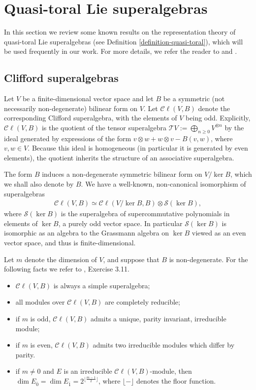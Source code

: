 \documentclass[12pt, a4paper, reqno]{amsart}
\def\TT{\mathcal{T}}
\def\CC{\mathcal{C}}
\def\ol{\overline}
\theoremstyle{definition}
\theoremstyle{definition}
\theoremstyle{definition}
\numberwithin{theorem}{section}
\numberwithin{lemma}{section}
\numberwithin{remark}{section}
\numberwithin{definition}{section}
\numberwithin{corollary}{section}
\numberwithin{proposition}{section}
\numberwithin{example}{section}
\begin{document}
	\section{Quasi-toral Lie superalgebras}\label{section_quasi_toral}
	
	In this section we review some known results on the representation theory of quasi-toral Lie superalgebras (see Definition \ref{definition-quasi-toral}), which will be used frequently in our work. For more details, we refer the reader to \cite{G} and \cite{GSS}.
	
	\subsection{Clifford superalgebras}\label{section_cliff_algs}
	Let \(V\) be a finite-dimensional vector space and let \(B\) be a symmetric (not necessarily non-degenerate) bilinear form on \(V\). Let \(\mathcal{C}\ell(V,B)\) denote the corresponding Clifford superalgebra, with the elements of \(V\) being odd.  Explicitly, $\CC\ell(V,B)$ is the quotient of the tensor superalgebra $\TT V:=\bigoplus\limits_{n\geq0}V^{\otimes n}$ by the ideal generated by expressions of the form $v\otimes w+w\otimes v-B(v,w)$, where $v,w\in V$.  Because this ideal is homogeneous (in particular it is generated by even elements), the quotient inherits the structure of an associative superalgebra.
	
	The form \(B\) induces a non-degenerate symmetric bilinear form on \(V/\ker B\), which we shall also denote by \(B\). We have a well-known, non-canonical isomorphism of superalgebras
	\begin{align}\label{eq_iso_cliff}
		\mathcal{C}\ell(V,B) \simeq \mathcal{C}\ell(V/\ker B,B) \otimes \mathcal{S} (\ker B),
	\end{align}
	where \(\mathcal{S}(\ker B)\) is the superalgebra of supercommutative polynomials in elements of \(\ker B\), a purely odd vector space. In particular $\mathcal{S}(\ker B)$ is isomorphic as an algebra to the Grassmann algebra on $\ker B$ viewed as an even vector space, and thus is finite-dimensional.
	
	Let $m$ denote the dimension of \(V\), and suppose that \(B\) is non-degenerate.  For the following facts we refer to \cite{CW}, Exercise 3.11.
	
	\begin{itemize}
		\item \(\mathcal{C}\ell(V,B)\) is always a simple superalgebra;
		\item all modules over \(\mathcal{C}\ell(V,B)\) are completely reducible;
		\item if \(m\) is odd, \(\mathcal{C}\ell(V,B)\) admits a unique, parity invariant, irreducible module;
		\item if \(m\) is even, \(\mathcal{C}\ell(V,B)\) admits two irreducible modules which differ by parity. 
		\item if \(m \neq 0\) and \(E\) is an irreducible \(\mathcal{C}\ell(V,B)\)-module, then \(\dim E_{\ol{0}} = \dim E_{\ol{1}} = 2^{\lfloor \frac{m-1}{2} \rfloor}\), where $\lfloor-\rfloor$ denotes the floor function.
	\end{itemize} 
	
\end{document}
